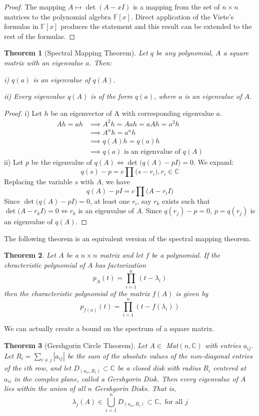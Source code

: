 \documentclass{article}
\newtheorem{theorem}{Theorem}[section]
\theoremstyle{remark}
\theoremstyle{definition}
\begin{document}
\begin{proof}
The mapping $A \mapsto \det{(A - x I)}$ is a mapping from the set of $n \times n$ matrices to the polynomial algebra $\mathbb{F}[x]$. Direct application of the Viete's formulas in $\mathbb{F}[x]$ produces the statement and this result can be extended to the rest of the formulas. 
\end{proof}

\begin{theorem}[Spectral Mapping Theorem]
Let $q$ be any polynomial, $A$ a square matrix with an eigenvalue $a$. Then: 

i) $q(a)$ is an eigenvalue of $q(A)$. 

ii) Every eigenvalue $q(A)$ is of the form $q(a)$, where $a$ is an eigenvalue of $A$. 
\end{theorem}
\begin{proof} 
i) Let $h$ be an eigenvector of A with corresponding eigenvalue $a$. 
\begin{align*}
    Ah = ah & \implies A^{2} h = Aah = aAh = a^{2} h \\
 & \implies A^{n} h = a^{n} h   \\
 & \implies q(A)h = q(a)h \\
 & \implies q(a) \text{ is an eigenvalue of }q(A)
\end{align*}
ii) Let $p$ be the eigenvalue of $q(A) \iff \det{\big(q(A) - p I\big)} = 0$. We expand: 
$$ q(s) - p = c\prod \big(s-r_{i}\big), r_{i} \in \mathbb{C} $$ 
Replacing the variable $s$ with $A$, we have
$$ q(A) - pI = c \prod \big(A-r_{i}I\big) $$
Since $\det{\big( q(A) - pI\big)} = 0$, at least one $r_{i}$, say $r_{k}$ exists such that $\det{\big( A - r_{k} I \big)} = 0 \iff r_{k}$ is an eigenvalue of $A$. Since $q(r_{j})-p = 0$, $p = q(r_{j})$ is an eigenvalue of $q(A)$. 
\end{proof}

The following theorem is an equivalent version of the spectral mapping theorem.
\begin{theorem}
Let $A$ be a $n \times n$ matrix and let $f$ be a polynomial. If the chracteristic polynomial of $A$ has factorization 
\[p_A (t) = \prod_{i = 1}^n (t - \lambda_i)\]
then the characteristic polynomial of the matrix $f(A)$ is given by 
\[p_{f(a)} (t) = \prod_{i = 1}^n (t - f(\lambda_i))\]
\end{theorem}

We can actually create a bound on the spectrum of a square matrix. 

\begin{theorem}[Gershgorin Circle Theorem]
Let $A \in $ Mat$(n, \mathbb{C})$ with entries $a_{i j}$. Let $R_i = \sum_{i \neq j} |a_{i j}|$ be the sum of the absolute values of the non-diagonal entries of the $i$th row, and let $D_(a_{i i}, R_i) \subset \mathbb{C}$ be a closed disk with radius $R_i$ centered at $a_{i i}$ in the complex plane, called a \textit{Gershgorin Disk}. Then every eigenvalue of $A$ lies within the union of all $n$ Gershgorin Disks. That is, 
\[ \lambda_j (A) \in \bigcup_{i= 1}^{n} D_(a_{i i}, R_i) \subset \mathbb{C}, \text{ for all } j\]
\end{theorem}
\end{document}
